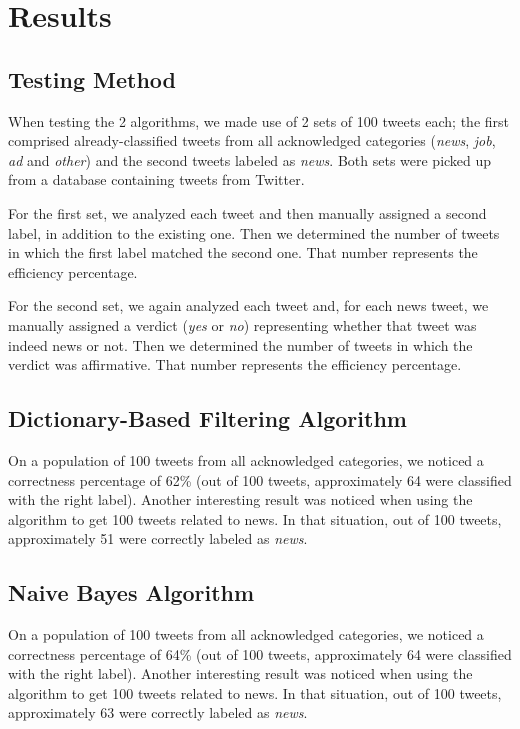 \documentclass{article}
\begin{document}
\section{Results}

\subsection{Testing Method}
\large{
\quad
When testing the 2 algorithms, we made use of 2 sets of 100 tweets each; the first comprised already-classified tweets from all acknowledged categories (\textit{news}, \textit{job}, \textit{ad} and \textit{other}) and the second tweets labeled as \textit{news}. Both sets were picked up from a database containing tweets from Twitter.

\quad
For the first set, we analyzed each tweet and then manually assigned a second label, in addition to the existing one. Then we determined the number of tweets in which the first label matched the second one. That number represents the efficiency percentage.

\quad
For the second set, we again analyzed each tweet and, for each news tweet, we manually assigned a verdict (\textit{yes} or \textit{no}) representing whether that tweet was indeed news or not. Then we determined the number of tweets in which the verdict was affirmative. That number represents the efficiency percentage.
}


\subsection{Dictionary-Based Filtering Algorithm}
\large
{
\quad
On a population of 100 tweets from all acknowledged categories, we noticed a correctness percentage of 62\% (out of 100 tweets, approximately 64 were classified with the right label). Another interesting result was noticed when using the algorithm to get 100 tweets related to news. In that situation, out of 100 tweets, approximately 51 were correctly labeled as \textit{news}.
}

\subsection{Naive Bayes Algorithm}
\large
{
\quad
On a population of 100 tweets from all acknowledged categories, we noticed a correctness percentage of 64\% (out of 100 tweets, approximately 64 were classified with the right label). Another interesting result was noticed when using the algorithm to get 100 tweets related to news. In that situation, out of 100 tweets, approximately 63 were correctly labeled as \textit{news}.
}
\end{document}
